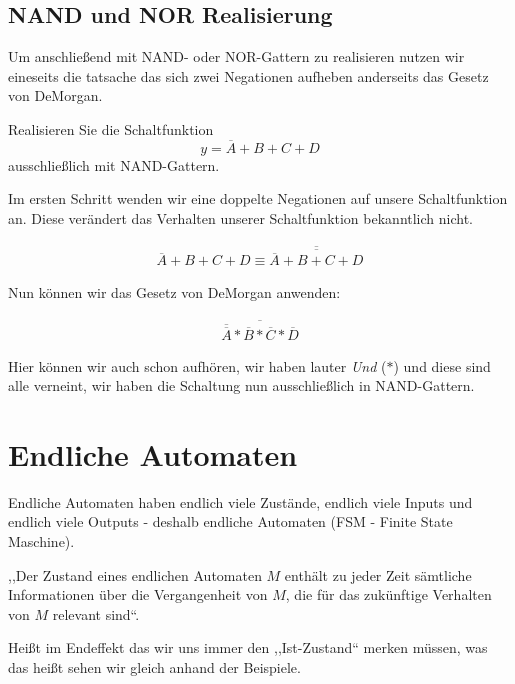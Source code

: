\documentclass{article}
\begin{document}
\subsection{NAND und NOR Realisierung}

Um anschließend mit NAND- oder NOR-Gattern zu realisieren nutzen wir eineseits die tatsache das sich zwei Negationen aufheben anderseits das Gesetz von DeMorgan.

\begin{question}[]
    Realisieren Sie die Schaltfunktion 
    \begin{equation*}
        y=\overline{A}+B+C+D
    \end{equation*}
    ausschließlich mit NAND-Gattern.
\end{question}

\begin{answer}[]
    Im ersten Schritt wenden wir eine doppelte Negationen auf unsere Schaltfunktion an.
    Diese verändert das Verhalten unserer Schaltfunktion bekanntlich nicht.

    \begin{align}
        \overline{A}+B+C+D   \equiv    \overline{\overline{\overline{A}+B+C+D} }
   \end{align}

   Nun können wir das Gesetz von DeMorgan anwenden:

   
   \begin{align}
    \overline{\overline{\overline{{A}}}*\overline{B}*\overline{C}*\overline{D}}
    \end{align}
   
    Hier können wir auch schon aufhören, wir haben lauter \emph{Und} ($*$) und diese sind alle verneint, wir haben die Schaltung nun ausschließlich in NAND-Gattern.
\end{answer}


\section{Endliche Automaten}

Endliche Automaten haben endlich viele Zustände, endlich viele Inputs und endlich viele Outputs - deshalb endliche Automaten (FSM - Finite State Maschine).

,,Der Zustand eines endlichen Automaten $M$ enthält zu jeder Zeit sämtliche Informationen über die Vergangenheit von $M$, die für das zukünftige Verhalten von $M$ relevant sind``.

Heißt im Endeffekt das wir uns immer den ,,Ist-Zustand`` merken müssen,  was das heißt sehen wir gleich anhand der Beispiele.
\end{document}
